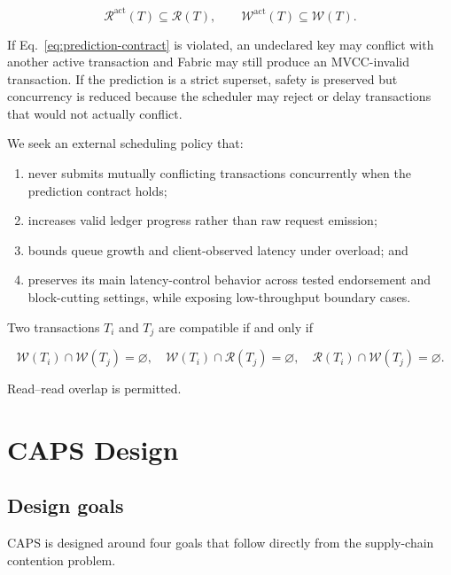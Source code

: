 \documentclass[fleqn,10pt,lineno]{wlpeerj}
\newcommand{\Rset}{\mathcal{R}}
\newcommand{\Wset}{\mathcal{W}}
\begin{document}
\begin{equation}
\mathcal{R}^{\mathrm{act}}(T)\subseteq\Rset(T),\qquad \mathcal{W}^{\mathrm{act}}(T)\subseteq\Wset(T).
\label{eq:prediction-contract}
\end{equation}

If Eq.~\eqref{eq:prediction-contract} is violated, an undeclared key may conflict with another active transaction and Fabric may still produce an MVCC-invalid transaction. If the prediction is a strict superset, safety is preserved but concurrency is reduced because the scheduler may reject or delay transactions that would not actually conflict.

We seek an external scheduling policy that:

\begin{enumerate}[noitemsep]
  \item never submits mutually conflicting transactions concurrently when the prediction contract holds;
  \item increases valid ledger progress rather than raw request emission;
  \item bounds queue growth and client-observed latency under overload; and
  \item preserves its main latency-control behavior across tested endorsement and block-cutting settings, while exposing low-throughput boundary cases.
\end{enumerate}

Two transactions $T_i$ and $T_j$ are compatible if and only if

\begin{equation}
\Wset(T_i)\cap\Wset(T_j)=\varnothing,\quad
\Wset(T_i)\cap\Rset(T_j)=\varnothing,\quad
\Rset(T_i)\cap\Wset(T_j)=\varnothing.
\label{eq:compatibility}
\end{equation}

Read--read overlap is permitted.

\section*{CAPS Design}

\subsection*{Design goals}

CAPS is designed around four goals that follow directly from the supply-chain contention problem.
\end{document}
